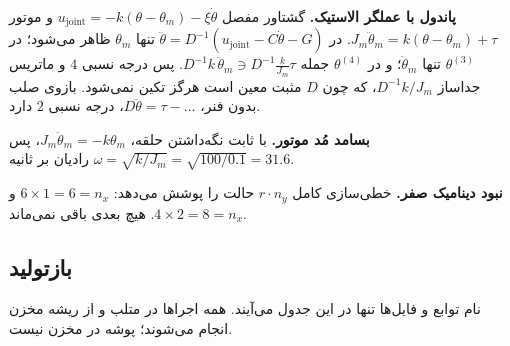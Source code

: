 \documentclass[10pt,twocolumn]{article}
\newcommand{\en}[1]{\lr{#1}}
\begin{document}
\textbf{پاندول با عملگر الاستیک.} گشتاور مفصل $u_{\mathrm{joint}}=-k(\theta-\theta_m)-\xi\dot\theta$ و
موتور $J_m\ddot\theta_m=k(\theta-\theta_m)+\tau$. در $\ddot\theta=D^{-1}(u_{\mathrm{joint}}-C\dot\theta-G)$ تنها
$\theta_m$ ظاهر می‌شود؛ در $\theta^{(3)}$ تنها $\dot\theta_m$؛ و در $\theta^{(4)}$ جمله
$D^{-1}k\,\ddot\theta_m\ni D^{-1}\tfrac{k}{J_m}\tau$. پس درجه نسبی $4$ و ماتریس جداساز $D^{-1}k/J_m$، که
چون $D$ مثبت معین است هرگز تکین نمی‌شود. بازوی صلب بدون فنر، $D\ddot\theta=\tau-\ldots$، درجه
نسبی $2$ دارد.

\textbf{بسامد مُد موتور.} با ثابت نگه‌داشتن حلقه، $J_m\ddot\theta_m=-k\theta_m$، پس
$\omega=\sqrt{k/J_m}=\sqrt{100/0.1}=31.6$ رادیان بر ثانیه.

\textbf{نبود دینامیک صفر.} خطی‌سازی کامل $r\cdot n_y$ حالت را پوشش می‌دهد: $6\times1=6=n_x$ و
$4\times2=8=n_x$. هیچ بعدی باقی نمی‌ماند.

\subsection{بازتولید}
\label{app:repro5}
نام توابع و فایل‌ها تنها در این جدول می‌آیند. همه اجراها در متلب و از ریشه مخزن انجام
می‌شوند؛ پوشه \en{Results/} در مخزن نیست.
\end{document}
